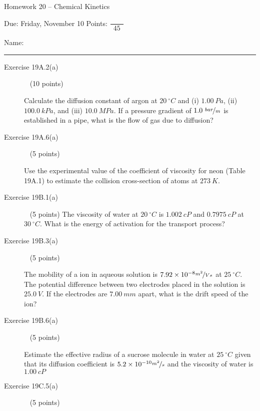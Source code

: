 \documentclass[12pt, openany, letterpaper]{memoir}
\begin{document}
\begin{center}
	{\large Homework 20 -- Chemical Kinetics}
	
	Due: Friday, November 10 \hspace{3em} Points: ${\dfrac{~}{~~45~~}}$
\end{center}

Name: \rule[-.1mm]{15em}{0.1pt}

\begin{description}	
	\item [Exercise 19A.2(a)] ~ (10 points)
	
	Calculate the diffusion constant of argon at $20~^\circ C$ and (i) $1.00~Pa$, (ii) $100.0~kPa$, and (iii) $10.0~MPa$. If a pressure gradient of $1.0~\nicefrac{bar}{m}$ is established in a pipe, what is the flow of gas due to diffusion?
	
	
	\vspace{19em}
	\item [Exercise 19A.6(a)] ~ (5 points)
	
	Use the experimental value of the coefficient of viscosity for neon (Table 19A.1) to estimate the collision cross-section of  atoms at $273~K$.
	
	\vspace{20em}
	\item [Exercise 19B.1(a)] ~ (5 points)
	The viscosity of water at $20~^\circ C$ is $1.002~cP$ and $0.7975~cP$ at $30~^\circ C$. What is the energy of activation for the transport process?
	
	\vspace{23em}
	\item [Exercise 19B.3(a)] ~ (5 points)
	
	The mobility of a  ion in aqueous solution is $7.92\times10^{-8}\nicefrac{m^2}{Vs}$ at $25~^\circ C$. The potential difference between two electrodes placed in the solution is $25.0~V$. If the electrodes are $7.00~mm$ apart, what is the drift speed of the  ion?
	
	\vspace{23em}	
	\item [Exercise 19B.6(a)] ~ (5 points)
	
	Estimate the effective radius of a sucrose molecule in water at $25~^\circ C$ given that its diffusion coefficient is $5.2\times10^{-10}\nicefrac{m^2}{s}$ and the viscosity of water is $1.00~cP$
	
	\vspace{23em}	
	\item [Exercise 19C.5(a)] ~ (5 points)	
	

\end{description}
\end{document}
